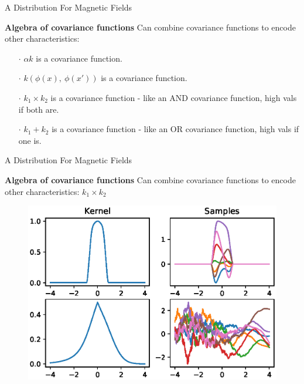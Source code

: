 \documentclass{beamer}
\begin{document}
\begin{frame}{A Distribution For Magnetic Fields}

  \textbf{Algebra of covariance functions} Can combine covariance functions to encode other characteristics:

  \vspace{1em}

  \begin{itemize}
    \setlength\itemsep{1em}
    \item[$\cdot$] $\alpha k$ is a covariance function.
    \item[$\cdot$] $k(\phi(x),\ \phi(x'))$ is a covariance function.
    \item[$\cdot$] $k_1 \times k_2$ is a covariance function - like an AND covariance function, high vals if both are.
    \item[$\cdot$] $k_1 + k_2$ is a covariance function - like an OR covariance function, high vals if one is.
  \end{itemize}

\end{frame}


\begin{frame}{A Distribution For Magnetic Fields}

  \textbf{Algebra of covariance functions} Can combine covariance functions to encode other characteristics: $k_1 \times k_2$

  \begin{figure}
    \includegraphics[width=\linewidth]{plots/multiply.eps}
  \end{figure}

\end{frame}
\end{document}

